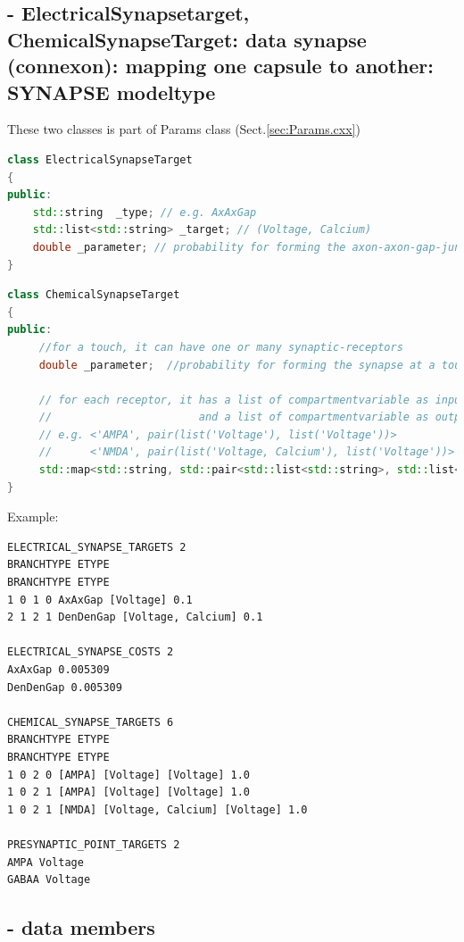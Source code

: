 \subsection{- ElectricalSynapsetarget, ChemicalSynapseTarget: data synapse
(connexon): mapping one capsule to another: SYNAPSE modeltype}

These two classes is part of Params class (Sect.\ref{sec:Params.cxx})

{\tiny
\begin{lstlisting}[language=C++]
class ElectricalSynapseTarget
{
public:
    std::string  _type; // e.g. AxAxGap 
    std::list<std::string> _target; // (Voltage, Calcium)
    double _parameter; // probability for forming the axon-axon-gap-junction
}
\end{lstlisting}
}

{\tiny
\begin{lstlisting}[language=C++]
class ChemicalSynapseTarget
{
public:
     //for a touch, it can have one or many synaptic-receptors
     double _parameter;  //probability for forming the synapse at a touch

     // for each receptor, it has a list of compartmentvariable as input,
     //                       and a list of compartmentvariable as output
     // e.g. <'AMPA', pair(list('Voltage'), list('Voltage'))>
     //      <'NMDA', pair(list('Voltage, Calcium'), list('Voltage'))>
     std::map<std::string, std::pair<std::list<std::string>, std::list<std::string> > > _targets;
}
\end{lstlisting}
}

Example:
\begin{verbatim}
ELECTRICAL_SYNAPSE_TARGETS 2
BRANCHTYPE ETYPE
BRANCHTYPE ETYPE
1 0 1 0 AxAxGap [Voltage] 0.1
2 1 2 1 DenDenGap [Voltage, Calcium] 0.1

ELECTRICAL_SYNAPSE_COSTS 2
AxAxGap 0.005309
DenDenGap 0.005309

CHEMICAL_SYNAPSE_TARGETS 6
BRANCHTYPE ETYPE
BRANCHTYPE ETYPE
1 0 2 0 [AMPA] [Voltage] [Voltage] 1.0
1 0 2 1 [AMPA] [Voltage] [Voltage] 1.0
1 0 2 1 [NMDA] [Voltage, Calcium] [Voltage] 1.0

PRESYNAPTIC_POINT_TARGETS 2
AMPA Voltage
GABAA Voltage
\end{verbatim}


\subsection{- data members}

